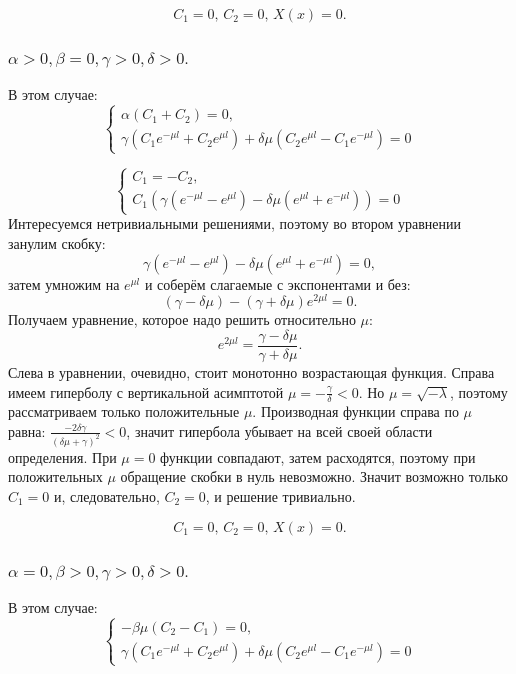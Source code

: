 \documentclass[12pt, a4paper]{article}
\begin{document}
\[ C_{1} = 0, \, C_{2} = 0, \, X(x) = 0. \]

\subsubsection{ $ \alpha > 0, \beta = 0, \gamma > 0, \delta > 0. $}
В этом случае:
\begin{displaymath}
	\begin{cases}
		\alpha (C_{1} + C_{2}) = 0, \\
		\gamma (C_{1} e^{-\mu l} + C_{2} e^{\mu l}) + \delta \mu (C_{2} e^{\mu l} - C_{1} e^{-\mu l}) = 0
	\end{cases}
\end{displaymath}

\begin{displaymath}
	\begin{cases}
		C_{1} = -C_{2}, \\
		C_{1} (\gamma (e^{-\mu l} - e^{\mu l}) - \delta \mu (e^{\mu l} + e^{-\mu l})) = 0
	\end{cases}
\end{displaymath}
Интересуемся нетривиальными решениями, поэтому во втором уравнении занулим скобку:
\[ \gamma (e^{-\mu l} - e^{\mu l}) - \delta \mu (e^{\mu l} + e^{-\mu l}) = 0, \]
затем умножим на $ e^{\mu l}$ и соберём слагаемые с экспонентами и без:
\[ (\gamma - \delta \mu) -  (\gamma + \delta \mu) e^{2 \mu l} = 0. \]
Получаем уравнение, которое надо решить относительно $\mu$:
\[ e^{2 \mu l} = \frac{\gamma - \delta \mu}{\gamma + \delta \mu}. \]
Слева в уравнении, очевидно, стоит монотонно возрастающая функция. Справа имеем гиперболу с вертикальной асимптотой $\mu = -\frac{\gamma}{\delta} < 0$. Но $\mu = \sqrt{-\lambda}$, поэтому рассматриваем только положительные $\mu$. Производная функции справа по $\mu$ равна: $\frac{-2\delta \gamma}{(\delta \mu + \gamma)^2} < 0$, значит гипербола убывает на всей своей области определения. При $\mu = 0$ функции совпадают, затем расходятся, поэтому при положительных $\mu$ обращение скобки в нуль невозможно. Значит возможно только $C_{1} = 0$ и, следовательно, $C_{2} = 0$, и решение тривиально.

\[ C_{1} = 0, \, C_{2} = 0, \, X(x) = 0. \]

\subsubsection{ $ \alpha = 0, \beta > 0, \gamma > 0, \delta > 0. $}
В этом случае: 
\begin{displaymath}
	\begin{cases}
		- \beta \mu (C_{2} - C_{1}) = 0, \\
		\gamma (C_{1} e^{-\mu l} + C_{2} e^{\mu l}) + \delta \mu (C_{2} e^{\mu l} - C_{1} e^{-\mu l}) = 0
	\end{cases}
\end{displaymath}
\end{document}
